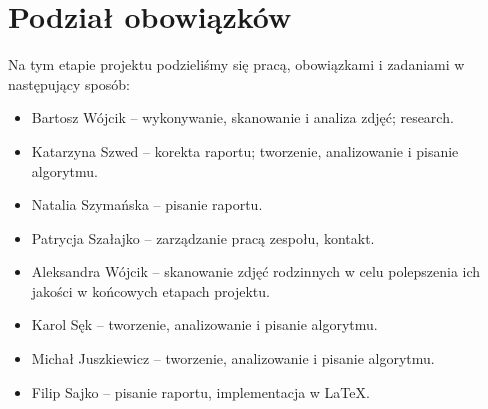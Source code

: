 \documentclass[]{mwart}
\begin{document}
\section{Podział obowiązków}
Na tym etapie projektu podzieliśmy się pracą, obowiązkami i zadaniami w następujący sposób:
\begin{itemize}
    \item Bartosz Wójcik -- wykonywanie, skanowanie i analiza zdjęć; research.
    \item Katarzyna Szwed -- korekta raportu; tworzenie, analizowanie i pisanie algorytmu.
    \item Natalia Szymańska -- pisanie raportu.
    \item Patrycja Szałajko -- zarządzanie pracą zespołu, kontakt.
    \item Aleksandra Wójcik -- skanowanie zdjęć rodzinnych w celu polepszenia ich jakości w końcowych etapach projektu.
    \item Karol Sęk -- tworzenie, analizowanie i pisanie algorytmu.
    \item Michał Juszkiewicz -- tworzenie, analizowanie i pisanie algorytmu.
    \item Filip Sajko -- pisanie raportu, implementacja w \LaTeX{}.
\end{itemize}
\end{document}
